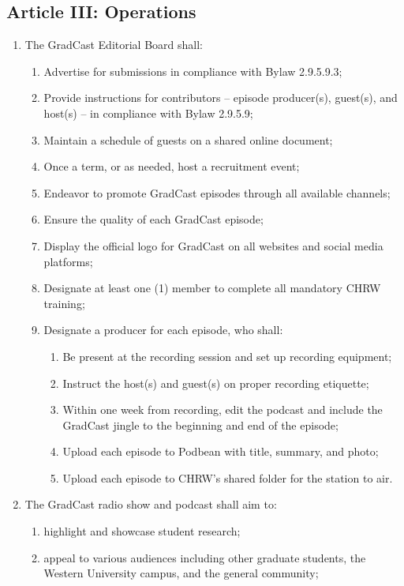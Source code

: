 \subsection{Article III: Operations}
\begin{enumerate} [label*=\arabic*., align=left]	
\item The GradCast Editorial Board shall:
\begin{enumerate}[label*=\arabic*., align=left]	
\item Advertise for submissions in compliance with Bylaw 2.9.5.9.3;
\item Provide instructions for contributors – episode producer(s), guest(s), and host(s) – in compliance with Bylaw 2.9.5.9;
\item Maintain a schedule of guests on a shared online document;
\item Once a term, or as needed, host a recruitment event;
\item Endeavor to promote GradCast episodes through all available channels;
\item Ensure the quality of each GradCast episode;
\item Display the official logo for GradCast on all websites and social media platforms;
\item Designate at least one (1) member to complete all mandatory CHRW training;
\item Designate a producer for each episode, who shall:
\begin{enumerate}[label*=\arabic*., align=left]
\item Be present at the recording session and set up recording equipment;
\item Instruct the host(s) and guest(s) on proper recording etiquette;
\item Within one week from recording, edit the podcast and include the GradCast jingle to the beginning and end of the episode;
\item Upload each episode to Podbean with title, summary, and photo;
\item Upload each episode to CHRW’s shared folder for the station to air.
\end{enumerate}
\end{enumerate}
\item The GradCast radio show and podcast shall aim to:
\begin{enumerate}[label*=\arabic*., align=left]	
\item highlight and showcase student research;
\item appeal to various audiences including other graduate students, the Western University campus, and the general community;

\end{enumerate}
\end{enumerate}
